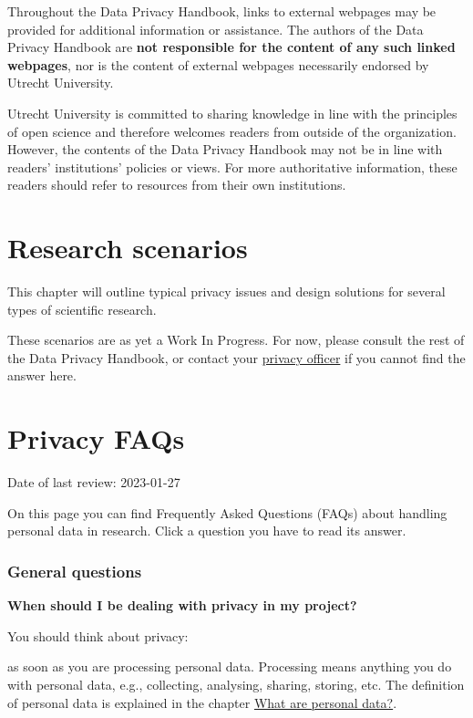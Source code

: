 \documentclass[
]{book}
\begin{document}
Throughout the Data Privacy Handbook, links to external webpages may be provided
for additional information or assistance. The authors of the Data Privacy
Handbook are \textbf{not responsible for the content of any such linked webpages}, nor
is the content of external webpages necessarily endorsed by Utrecht University.

Utrecht University is committed to sharing knowledge in line with the principles
of open science and therefore welcomes readers from outside of the organization.
However, the contents of the Data Privacy Handbook may not be in line with readers'
institutions' policies or views. For more authoritative information, these
readers should refer to resources from their own institutions.

\hypertarget{research-scenarios}{%
\chapter{Research scenarios}\label{research-scenarios}}

This chapter will outline typical privacy issues and design solutions for
several types of scientific research.

These scenarios are as yet a Work In Progress. For now, please consult the rest
of the Data Privacy Handbook, or contact your \protect\hyperlink{support}{privacy officer} if you
cannot find the answer here.

\hypertarget{faq}{%
\chapter{Privacy FAQs}\label{faq}}

Date of last review: 2023-01-27

On this page you can find Frequently Asked Questions (FAQs) about handling
personal data in research. Click a question you have to read its answer.

\hypertarget{general}{%
\subsection{General questions}\label{general}}

\textbf{When should I be dealing with privacy in my project?}

You should think about privacy:

as soon as you are processing personal data. Processing means anything you do with personal data, e.g., collecting, analysing, sharing, storing, etc. The definition of personal data is explained in the chapter \protect\hyperlink{personal-data}{What are personal data?}.
\end{document}
